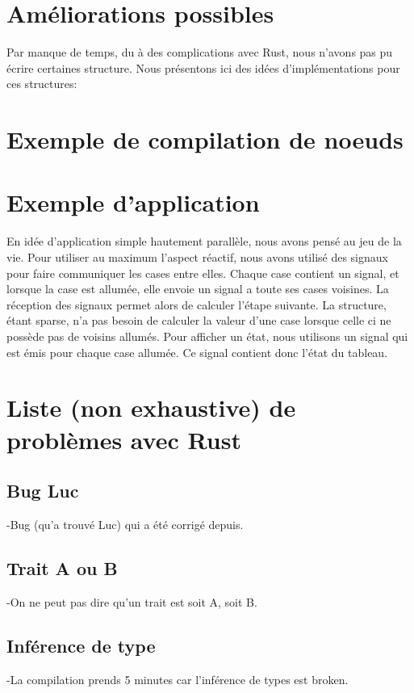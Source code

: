 \documentclass[a4paper]{article}
\renewcommand{\(}{\left(}
\renewcommand{\)}{\right)}
\begin{document}
\section{Améliorations possibles}

Par manque de temps, du à des complications avec Rust, nous n'avons pas pu
écrire certaines structure. Nous présentons ici des idées d'implémentations pour
ces structures: 

\section{Exemple de compilation de noeuds}


\section{Exemple d'application}

En idée d'application simple hautement parallèle, nous avons pensé au jeu de la
vie. Pour utiliser au maximum l'aspect réactif, nous avons utilisé des signaux
pour faire communiquer les cases entre elles. Chaque case contient un signal, et
lorsque la case est allumée, elle envoie un signal a toute ses cases voisines.
La réception des signaux permet alors de calculer l'étape suivante. La
structure, étant sparse, n'a pas besoin de calculer la valeur d'une case lorsque
celle ci ne possède pas de voisins allumés. Pour afficher un état, nous
utilisons un signal qui est émis pour chaque case allumée. Ce signal contient
donc l'état du tableau.

\section{Liste (non exhaustive) de problèmes avec Rust}
\subsection{Bug Luc}
-Bug (qu'a trouvé Luc) qui a été corrigé depuis.

\subsection{Trait A ou B}
-On ne peut pas dire qu'un trait est soit A, soit B.

\subsection{Inférence de type}
-La compilation prends 5 minutes car l'inférence de types est broken.
\end{document}
